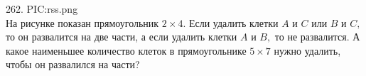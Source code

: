 262. {{PIC:rss.png}}\\
На рисунке показан прямоугольник $2\times4.$ Если удалить клетки $A$ и $C$ или $B$ и $C,$ то он развалится на две части, а если удалить клетки $A$ и $B,$ то не развалится. А какое наименьшее количество клеток в прямоугольнике $5\times7$ нужно удалить, чтобы он развалился на части?\\
